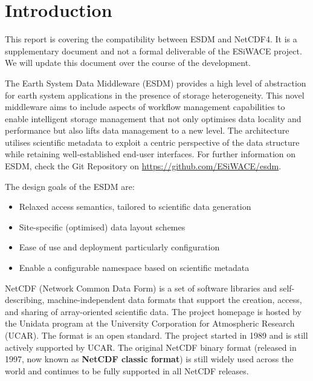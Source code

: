 \chapter{Introduction}
\label{ch:intro}

This report is covering the compatibility between ESDM and NetCDF4. It is a supplementary document and not a formal deliverable of the ESiWACE project. We will update this document over the course of the development.

The Earth System Data Middleware (ESDM) provides a high level of abstraction for earth system applications in the presence of storage heterogeneity. This novel middleware aims to include aspects of workflow management capabilities to enable intelligent storage management that not only optimises data locality and performance but also lifts data management to a new level. The architecture utilises scientific metadata to exploit a centric perspective of the data structure while retaining well-established end-user interfaces. For further information on ESDM, check the Git Repository on \url{https://github.com/ESiWACE/esdm}.

The design goals of the ESDM are:

\begin{itemize}

\item Relaxed access semantics, tailored to scientific data generation

\item Site-specific (optimised) data layout schemes

\item Ease of use and deployment particularly configuration

\item Enable a configurable namespace based on scientific metadata

\end{itemize}

NetCDF (Network Common Data Form) is a set of software libraries and self-describing, machine-independent data formats that support the creation, access, and sharing of array-oriented scientific data.
The project homepage is hosted by the Unidata program at the University Corporation for Atmospheric Research (UCAR). The format is an open standard.
The project started in 1989 and is still actively supported by UCAR.
The original NetCDF binary format (released in 1997, now known as \textbf{NetCDF classic format}) is still widely used across the world and continues to be fully supported in all NetCDF releases.

